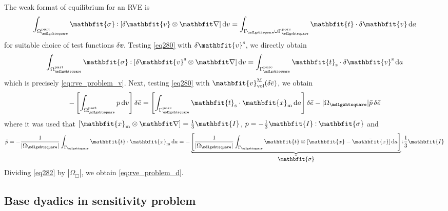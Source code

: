 \documentclass[12pt,a4paper,fleqn]{article}
\renewcommand{\ta}[1]{\mathbfit{#1}}
\renewcommand{\ts}[1]{\mathbfit{#1}}
\renewcommand{\Box}{\mdlgwhtsquare}
\newcommand{\pore}{\mathrm{pore}}
\newcommand{\particle}{\mathrm{part}}
\newcommand{\surf}{\mathrm{s}}
\begin{document}
The weak format of equilibrium for an RVE is
\begin{equation}
    \int_{\Omega^\particle_\Box} \ts{\sigma} \dprod \left[\delta \ta{v}\outerp\diff\right] \dif v =
    \int_{\Gamma_\Box\cup\Gamma_\Box^\pore} \ta{t} \cdot \delta\ta{v} \dif a
\label{eq280}
\end{equation}
for suitable choice of test functions $\delta \ta{v}$. Testing \eqref{eq280} with $\delta \ta{v}^\fluct$, we directly obtain
\begin{equation}
    \int_{\Omega^\particle_\Box} \ts{\sigma} \dprod \left[\delta \ta{v}^\fluct\outerp\diff\right] \dif v =
    \int_{\Gamma_\Box^\pore} \ta{t}_\surf \cdot \delta\ta{v}^\fluct \dif a
\label{eq281}
\end{equation}
which is precisely \eqref{eq:rve_problem_v}. Next, testing \eqref{eq280} with $\ta{v}^\macro_\vol(\delta\bar{e})$, we obtain
\begin{equation}
    - \left[\int_{\Omega^\particle_\Box} p  \dif v \right]\delta\bar{e} =
    \left[\int_{\Gamma_\Box^\pore} \ta{t}_\surf \cdot \ta{x}_\mean \dif a\right]\delta\bar{e}
    - |\Omega_\Box|\bar{p}\,\delta\bar{e}
\label{eq282}
\end{equation}
where it was used that $[\ta{x}_\mean\outerp\diff]=\frac{1}{3}\ts{I}$, $p=-\frac{1}{3}\ts{I}\dprod\ts{\sigma}$ and
\begin{equation}
    \bar{p} = - \frac{1}{|\Omega_\Box|} \int_{\Gamma_\Box} \ta{t} \cdot \ta{x}_\mean \dif a =
     - \underbrace{\left[\frac{1}{|\Omega_\Box|} \int_{\Gamma_\Box} \ta{t} \outerp [\ta{x}-\bar{\ta{x}}] \dif a\right]}_{\displaystyle\bar{\ts\sigma}}  \dprod \frac{1}{3}\ts{I}
\end{equation}
Dividing \eqref{eq282} by $|\Omega_\Box|$, we obtain \eqref{eq:rve_problem_d}.

\subsection{Base dyadics in sensitivity problem}
\end{document}
